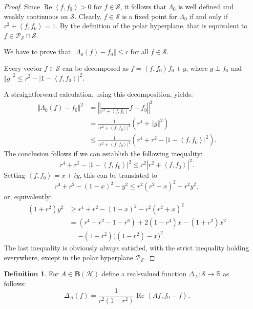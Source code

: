 \documentclass{tran-l}
\theoremstyle{definition}
\newtheorem{defn}[thm]{Definition}
\theoremstyle{remark}
\numberwithin{equation}{subsection}
\DeclareMathOperator{\RE}{Re}
\newcommand{\To}{\longrightarrow}
\newcommand{\s}{\mathcal{S}}
\newcommand{\BH}{\mathbf{B}(\mathcal{H})}
\newcommand{\Real}{\mathbb{R}}
\newcommand{\Polar}{\mathcal{P}_{\s}}
\newcommand{\abs}[1]{\left\vert#1\right\vert}
\newcommand{\seq}[1]{\left<#1\right>}
\newcommand{\norm}[1]{\left\Vert#1\right\Vert}
\begin{document}
\begin{proof}
Since $\RE\seq{f,f_0}>0$ for $f\in\s$, it follows that $\Lambda_0$ is well defined and weakly continuous on $\s$. Clearly, $f\in\s$ is a fixed point for $\Lambda_0$ if and only if $r^2+\seq{f,f_0}=1$. By the definition of the polar hyperplane, that is equivalent to $f\in\Polar\cap\s$.

We have to prove that $\norm{\Lambda_0(f)-f_0}\leq r$ for all $f\in\s$.

Every vector $f\in\s$ can be decomposed as $f=\seq{f,f_0}f_0+g$, where $g \perp f_0$ and $\norm{g}^2\leq r^2-\abs{1-\seq{f,f_0}}^2$.

\goodbreak

A straightforward calculation, using this decomposition, yields:
\begin{align*}
  \norm{\Lambda_0(f)-f_0}^2 &=
  \norm{\frac{1}{r^2+\seq{f,f_0}} f - f_0}^2\\ &=
  \frac{1}{\abs{r^2+\seq{f,f_0}}^2}
    \left(r^4+\norm{g}^2\right)\\ &\leq
  \frac{1}{\abs{r^2+\seq{f,f_0}}^2}
    \left(r^4+r^2-\abs{1-\seq{f,f_0}}^2\right).
\end{align*}
The conclusion follows if we can establish the following inequality:
\[ r^4+r^2 - \abs{1-\seq{f,f_0}}^2 \leq r^2\abs{r^2+\seq{f,f_0}}^2. \]
Setting $\seq{f,f_0}=x+i{y}$, this can be translated to
\[ r^4+r^2 - (1-x)^2 - y^2 \leq r^2(r^2 + x)^2 + r^2y^2, \]
or, equivalently:
\begin{align*}
  (1+r^2)y^2 &\geq r^4+r^2 - (1-x)^2 - r^2(r^2 + x)^2\\ & =
  (r^4+r^2-1-r^6) + 2(1-r^4)x - (1+r^2)x^2 \\ & =
  -(1+r^2)\big((1-r^2) - x\big)^2.
\end{align*}
The last inequality is obviously always satisfied, with the strict inequality holding everywhere, except in the polar hyperplane $\Polar$.
\end{proof}

\begin{defn}
For $A\in\BH$ define a real-valued function $\Delta_A\colon\s\To\Real$ as follows:
\[ \Delta_A(f) = \frac{1}{r^2(1-r^2)}\RE\seq{A{f}, f_0-f}. \]
\end{defn}
\end{document}
